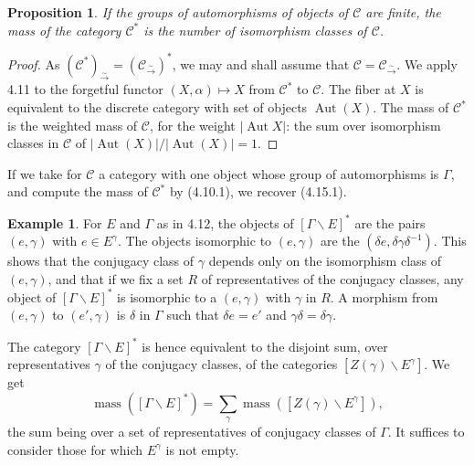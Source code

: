 \documentclass[11pt,a4paper]{article}
\theoremstyle{plain}
\newtheorem{proposition}[theorem]{Proposition}
\theoremstyle{definition}
\newtheorem{example}[theorem]{Example}
\DeclareMathOperator{\Aut}{Aut}
\DeclareMathOperator{\mass}{mass}
\newcommand{\isom}{\xrightarrow{\sim}}
\begin{document}
\begin{proposition}
If the groups of automorphisms of objects of $\mathcal{C}$ are finite, the mass of the category $\mathcal{C}^*$ is the number of isomorphism classes of $\mathcal{C}$.
\end{proposition}

\begin{proof}
As $(\mathcal{C}^*)_{\isom} = (\mathcal{C}_{\isom})^*$, we may and shall assume that $\mathcal{C} = \mathcal{C}_{\isom}$. We apply 4.11 to the forgetful functor $(X, \alpha) \mapsto X$ from $\mathcal{C}^*$ to $\mathcal{C}$. The fiber at $X$ is equivalent to the discrete category with set of objects $\Aut(X)$. The mass of $\mathcal{C}^*$ is the weighted mass of $\mathcal{C}$, for the weight $|\Aut X|$: the sum over isomorphism classes in $\mathcal{C}$ of $|\Aut(X)|/|\Aut(X)| = 1$.
\end{proof}

If we take for $\mathcal{C}$ a category with one object whose group of automorphisms is $\Gamma$, and compute the mass of $\mathcal{C}^*$ by (4.10.1), we recover (4.15.1).

\begin{example}
For $E$ and $\Gamma$ as in 4.12, the objects of $[\Gamma \backslash E]^*$ are the pairs $(e, \gamma)$ with $e \in E^\gamma$. The objects isomorphic to $(e, \gamma)$ are the $(\delta e, \delta \gamma \delta^{-1})$. This shows that the conjugacy class of $\gamma$ depends only on the isomorphism class of $(e, \gamma)$, and that if we fix a set $R$ of representatives of the conjugacy classes, any object of $[\Gamma \backslash E]^*$ is isomorphic to a $(e, \gamma)$ with $\gamma$ in $R$. A morphism from $(e, \gamma)$ to $(e', \gamma)$ is $\delta$ in $\Gamma$ such that $\delta e = e'$ and $\gamma \delta = \delta \gamma$.

The category $[\Gamma \backslash E]^*$ is hence equivalent to the disjoint sum, over representatives $\gamma$ of the conjugacy classes, of the categories $[Z(\gamma) \backslash E^\gamma]$. We get
\begin{equation}
\mass([\Gamma \backslash E]^*) = \sum_{\gamma} \mass([Z(\gamma) \backslash E^\gamma]), \tag{4.17.1}
\end{equation}
the sum being over a set of representatives of conjugacy classes of $\Gamma$. It suffices to consider those for which $E^\gamma$ is not empty.
\end{example}
\end{document}
